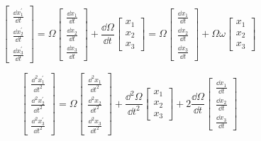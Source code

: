 \documentclass{ctexart}
\numberwithin{equation}{subsection}
\numberwithin{theorem}{subsection}
\numberwithin{definition}{subsection}
\numberwithin{proof}{subsection}
\numberwithin{lemma}{subsection}
\numberwithin{example}{subsection}
\numberwithin{remark}{subsection}
\numberwithin{corollary}{subsection}
\numberwithin{exercise}{subsection}
\numberwithin{problem}{subsection}
\numberwithin{question}{section}
\numberwithin{method}{subsection}
\begin{document}
        \begin{equation}
            \begin{bmatrix}
                \frac{\dd x_1^\prime}{\dd t} \\
                \frac{\dd x_2^\prime}{\dd t} \\
                \frac{\dd x_3^\prime}{\dd t}
            \end{bmatrix} = \Omega \begin{bmatrix}
                \frac{\dd x_1}{\dd t} \\
                \frac{\dd x_2}{\dd t} \\
                \frac{\dd x_3}{\dd t}
            \end{bmatrix} + \frac{\dd \Omega}{\dd t} \begin{bmatrix}
                x_1 \\
                x_2 \\
                x_3
            \end{bmatrix} = \Omega \begin{bmatrix}
                \frac{\dd x_1}{\dd t} \\
                \frac{\dd x_2}{\dd t} \\
                \frac{\dd x_3}{\dd t}
            \end{bmatrix} + \Omega \omega \begin{bmatrix}
                x_1 \\
                x_2 \\
                x_3
            \end{bmatrix}
        \end{equation}

        \begin{equation}
            \begin{bmatrix}
                \frac{\dd^2 x_1^\prime}{\dd t^2} \\
                \frac{\dd^2 x_2^\prime}{\dd t^2} \\
                \frac{\dd^2 x_3^\prime}{\dd t^2}
            \end{bmatrix} = \Omega \begin{bmatrix}
                \frac{\dd^2 x_1}{\dd t^2} \\
                \frac{\dd^2 x_2}{\dd t^2} \\
                \frac{\dd^2 x_3}{\dd t^2}
            \end{bmatrix} + \frac{\dd^2 \Omega}{\dd t^2} \begin{bmatrix}
                x_1 \\
                x_2 \\
                x_3
            \end{bmatrix} + 2\frac{\dd \Omega}{\dd t} \begin{bmatrix}
                \frac{\dd x_1}{\dd t} \\
                \frac{\dd x_2}{\dd t} \\
                \frac{\dd x_3}{\dd t}
            \end{bmatrix}
        \end{equation}
\end{document}
